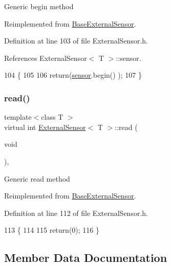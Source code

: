 Generic begin method 

Reimplemented from \hyperlink{classBaseExternalSensor_a87d132803d4f4fdd4e66332809f0c9a0}{Base\+External\+Sensor}.



Definition at line 103 of file External\+Sensor.\+h.



References External\+Sensor$<$ T $>$\+::sensor.


\begin{DoxyCode}
104     \{
105 
106         \textcolor{keywordflow}{return}(\hyperlink{classExternalSensor_a6e1f518119abe08c14b498ce24a7e1b3}{sensor}.begin() );  
107     \}
\end{DoxyCode}
\mbox{\label{classExternalSensor_a6dbf2d6b1c183740ce0f153d6e43ccb2}} 
\subsubsection{\texorpdfstring{read()}{read()}}
{\footnotesize\ttfamily template$<$class T $>$ \\
virtual int \hyperlink{classExternalSensor}{External\+Sensor}$<$ T $>$\+::read (\begin{DoxyParamCaption}\item[{void}]{ }\end{DoxyParamCaption})\hspace{0.3cm}{\ttfamily [inline]}, {\ttfamily [virtual]}}

Generic read method 

Reimplemented from \hyperlink{classBaseExternalSensor_a7e0a98f350148d7645031315657aa5ec}{Base\+External\+Sensor}.



Definition at line 112 of file External\+Sensor.\+h.


\begin{DoxyCode}
113     \{
114 
115         \textcolor{keywordflow}{return}(0);
116     \}
\end{DoxyCode}


\subsection{Member Data Documentation}
\mbox{\label{classExternalSensor_a6e1f518119abe08c14b498ce24a7e1b3}} 
